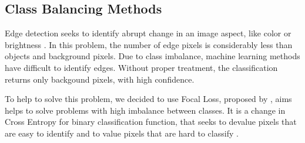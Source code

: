 \subsection{Class Balancing Methods}
\label{cap5_balanc_classes}

Edge detection seeks to identify abrupt change in an image aspect, like color or brightness \cite{MARTIN:1273918}.
In this problem, the number of edge pixels is considerably less than objects and background pixels.
Due to class imbalance, machine learning methods have difficult to identify edges.
Without proper treatment, the classification returns only backgound pixels, with high confidence.

To help to solve this problem, we decided to use Focal Loss, proposed by \cite{Lin:2017}, aims helps to solve problems with high imbalance between classes.
It is a change in Cross Entropy for binary classification function, that seeks to devalue pixels that are easy to identify and to value pixels that are hard to classify \cite{Lin:2017}.

